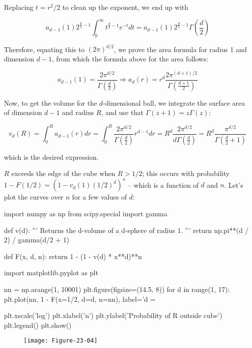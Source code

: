 Replacing \(t = r^2 / 2\) to clean up the exponent, we end up with

\[ a_{d-1}(1) 2^{\frac{d}{2} - 1} \int_0^\infty t^{\frac{d}{2} - 1} e^{-t}  dt = a_{d-1}(1) 2^{\frac{d}{2} - 1} \Gamma \left( \frac{d}{2} \right)\]

Therefore, equating this to \((2 \pi)^{d/2}\), we prove the area formula
for radius 1 and dimension \(d - 1\), from which the formula above for
the area follows:

\[ a_{d - 1}(1) = \frac{2 \pi^{d/2}}{\Gamma \left( \frac{d}{2}\right)} \Longrightarrow a_d(r) = r^d \frac{2 \pi^{(d + 1)/2}}{\Gamma \left( \frac{d + 1}{2}\right)} \]

Now, to get the volume for the \(d\)-dimensional ball, we integrate the
surface area of dimension \(d-1\) and radius \(R\), and use that
\(\Gamma(z + 1) = z \Gamma(z)\):

\[ v_d(R) = \int_0^R a_{d-1}(r) dr = \int_0^R \frac{2 \pi^{d/2}}{\Gamma \left( \frac{d}{2}\right)} r^{d - 1} dr = R^d \frac{2 \pi^{d / 2}}{d \Gamma \left( \frac{d}{2} \right) } = R^d \frac{\pi^{d/2}}{\Gamma\left(\frac{d}{2} + 1\right)} \]

which is the desired expression.

\(R\) exceeds the edge of the cube when \(R > 1/2\); this occurs with
probability \(1 - F(1/2) = \left(1 - v_d(1) (1/2)^d\right)^n\) -- which
is a function of \(d\) and \(n\). Let's plot the curves over \(n\) for a
few values of \(d\):

\begin{python}
import numpy as np
from scipy.special import gamma

def v(d):
    ''' Returns the d-volume of a d-sphere of radius 1. '''
    return np.pi**(d / 2) / gamma(d/2 + 1)

def F(x, d, n):
    return 1 - (1 - v(d) * x**d)**n
\end{python}

\begin{python}
import matplotlib.pyplot as plt

nn = np.arange(1, 10001)
plt.figure(figsize=(14.5, 8))
for d in range(1, 17):
    plt.plot(nn, 1 - F(x=1/2, d=d, n=nn), label='d = %

plt.xscale('log')
plt.xlabel('n')
plt.ylabel('Probability of R outside cube')
plt.legend()
plt.show()
\end{python}

\begin{figure}[H]
\texttt{[image: Figure-23-04]}
\end{figure}

